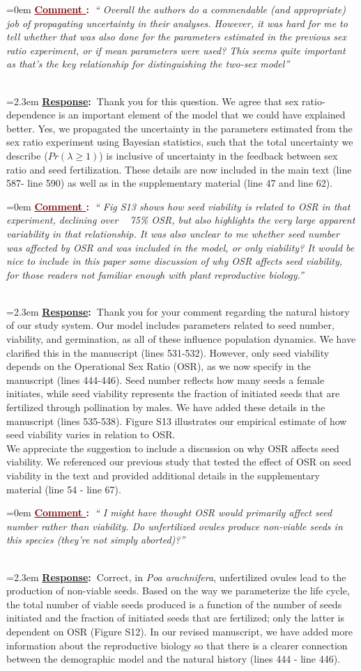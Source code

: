 \documentclass[12pt]{article}
\newcounter{cN}
\newcommand{\comment}[1]{
	\vspace{2em}
	\refstepcounter{cN} %
	\noindent \hangindent=0em \textbf{\textcolor{Maroon}{\uline{Comment \thecN}:~}}\emph{``#1''}
	}
\newcommand{\response}[1]{
	\\[0.25em]
	\hangindent=2.3em \textbf{\textcolor{NavyBlue}{\uline{Response}:~}}#1
	}
\begin{document}
\comment{ Overall the authors do a commendable (and appropriate) job of propagating uncertainty in their analyses. However, it was hard for me to tell whether that was also done for the parameters estimated in the previous sex ratio experiment, or if mean parameters were used? This seems quite important as that’s the key
relationship for distinguishing the two-sex model}
\response{Thank you for this question. We agree that sex ratio-dependence is an important element of the model that we could have explained better. Yes, we propagated the uncertainty in the parameters estimated from the sex ratio experiment using Bayesian statistics, such that the total uncertainty we describe ($Pr(\lambda \ge 1)$) is inclusive of uncertainty in the feedback between sex ratio and seed fertilization. 
These details are now included in the main text (line 587- line 590) as well as in the supplementary material (line 47 and line 62).}

\comment{ Fig S13 shows how seed viability is related to OSR in that experiment, declining over ~ 75\% OSR, but also highlights
the very large apparent variability in that relationship. It was also unclear to me whether seed number was affected by OSR and was included in the model, or only
viability? It would be nice to include in this paper some discussion of why OSR affects seed viability, for those readers not familiar enough with plant reproductive
biology.}
\response{Thank you for your comment regarding the natural history of our study system. 
Our model includes parameters related to seed number, viability, and germination, as all of these influence population dynamics. 
We have clarified this in the manuscript (lines 531-532).
However, only seed viability depends on the Operational Sex Ratio (OSR), as we now specify in the manuscript (lines 444-446). 
Seed number reflects how many seeds a female initiates, while seed viability represents the fraction of initiated seeds that are fertilized through pollination by males.
We have added these details in the manuscript (lines 535-538).
Figure S13 illustrates our empirical estimate of how seed viability varies in relation to OSR. 
\\
We appreciate the suggestion to include a discussion on why OSR affects seed viability. We referenced our previous study \citep{compagnoni2017can} that tested the effect of OSR on seed viability in the text and provided additional details in the supplementary material (line 54 - line 67).
}

\comment{ I might have thought OSR would primarily affect seed number rather than viability. Do unfertilized ovules produce non-viable seeds in this species (they’re not simply aborted)?}
\response{Correct, in \emph{Poa arachnifera}, unfertilized ovules lead to the production of non-viable seeds. 
Based on the way we parameterize the life cycle, the total number of viable seeds produced is a function of the number of seeds initiated and the fraction of initiated seeds that are fertilized; only the latter is dependent on OSR (Figure S12). 
In our revised manuscript, we have added more information about the reproductive biology so that there is a clearer connection between the demographic model and the natural history (lines 444 - line 446). }
\end{document}

